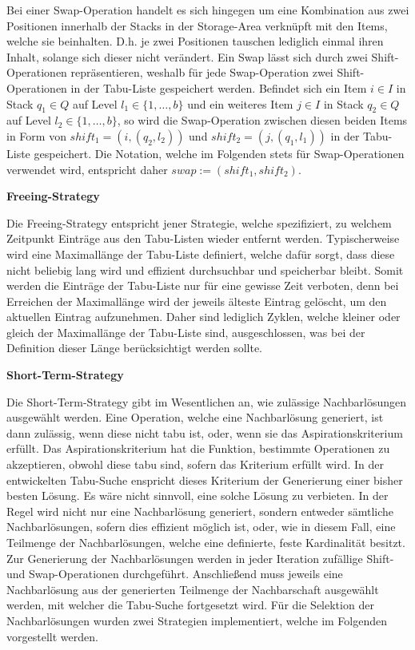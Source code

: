 Bei einer Swap-Operation handelt es sich hingegen um eine Kombination aus zwei Positionen innerhalb der Stacks in der Storage-Area verknüpft mit den Items, welche sie beinhalten. D.h. je zwei Positionen tauschen lediglich einmal ihren Inhalt,
solange sich dieser nicht verändert. Ein Swap lässt sich durch zwei Shift-Operationen repräsentieren, weshalb für jede Swap-Operation
zwei Shift-Operationen in der Tabu-Liste gespeichert werden. Befindet sich ein Item $i \in I$ in Stack $q_1 \in Q$ auf Level
$l_1 \in \{1, \dotsc, b\}$ und ein weiteres Item $j \in I$ in Stack $q_2 \in Q$ auf Level $l_2 \in \{1, \dotsc, b\}$,
so wird die Swap-Operation zwischen diesen beiden Items in Form von $shift_1 = (i, (q_2, l_2))$ und $shift_2 = (j, (q_1, l_1))$
in der Tabu-Liste gespeichert. Die Notation, welche im Folgenden stets für Swap-Operationen verwendet wird,
entspricht daher $swap := (shift_1, shift_2)$.

\textbf{Freeing-Strategy}

Die Freeing-Strategy entspricht jener Strategie, welche spezifiziert, zu welchem Zeitpunkt Einträge aus den
Tabu-Listen wieder entfernt werden. Typischerweise wird eine Maximallänge der Tabu-Liste definiert,
welche dafür sorgt, dass diese nicht beliebig lang wird und effizient durchsuchbar und speicherbar bleibt.
Somit werden die Einträge der Tabu-Liste nur für eine gewisse Zeit verboten, denn bei Erreichen der Maximallänge
wird der jeweils älteste Eintrag gelöscht, um den aktuellen Eintrag aufzunehmen.
Daher sind lediglich Zyklen, welche kleiner oder gleich der Maximallänge der Tabu-Liste sind,
ausgeschlossen, was bei der Definition dieser Länge berücksichtigt werden sollte.

\textbf{Short-Term-Strategy}

Die Short-Term-Strategy gibt im Wesentlichen an, wie zulässige Nachbarlösungen ausgewählt werden.
Eine Operation, welche eine Nachbarlösung generiert, ist dann zulässig, wenn diese nicht tabu ist,
oder, wenn sie das Aspirationskriterium erfüllt. Das Aspirationskriterium hat die Funktion, bestimmte
Operationen zu akzeptieren, obwohl diese tabu sind, sofern das Kriterium erfüllt wird.
In der entwickelten Tabu-Suche enspricht dieses Kriterium der Generierung einer bisher besten Lösung.
Es wäre nicht sinnvoll, eine solche Lösung zu verbieten.\newline
In der Regel wird nicht nur eine Nachbarlösung generiert, sondern entweder sämtliche Nachbarlösungen,
sofern dies effizient möglich ist, oder, wie in diesem Fall, eine Teilmenge der Nachbarlösungen,
welche eine definierte, feste Kardinalität besitzt. Zur Generierung der Nachbarlösungen werden in jeder
Iteration zufällige Shift- und Swap-Operationen durchgeführt. Anschließend muss jeweils eine Nachbarlösung
aus der generierten Teilmenge der Nachbarschaft ausgewählt werden, mit welcher die Tabu-Suche fortgesetzt wird.
Für die Selektion der Nachbarlösungen wurden zwei Strategien implementiert, welche im Folgenden vorgestellt werden.

